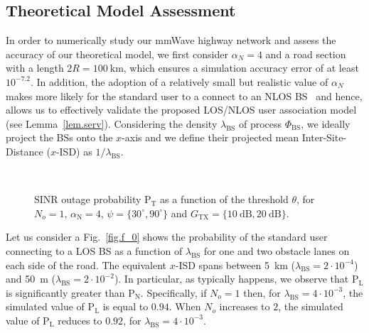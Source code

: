 \documentclass[10pt,journal,a4paper]{IEEEtran}
\begin{document}
\subsection{Theoretical Model Assessment}\label{subsec.val}
In order to numerically study our mmWave highway network and assess the accuracy of our theoretical model, we first consider $\alpha_{N} = 4$ and a road section with a length $2R = \SI{100}{\kilo\meter}$, which ensures a simulation accuracy error of at least $10^{-7.2}$. 
{In addition, the adoption of a relatively small but realistic value of $\alpha_{N}$ makes more likely for the standard user to a connect to an NLOS BS~\cite{6932503} and hence, allows us to effectively validate the proposed LOS/NLOS user association model (see Lemma~\ref{lem.serv}).}
Considering the density $\lambda_\mathrm{BS}$ of process $\Phi_\mathrm{BS}$, we ideally project the BSs onto the $x$-axis and we define their projected mean Inter-Site-Distance ($x$-ISD) as $1/\lambda_\mathrm{BS}$.

\begin{figure}[tb]
\centering
{}\\
\caption{SINR outage probability $\mathrm{P}_{\mathrm{T}}$ as a function of the threshold $\theta$, for $N_o = 1$, $\alpha_\mathrm{N} = 4$, $\psi = \{30^\circ, 90^\circ\}$ and $G_{\mathrm{TX}} = \{\SI{10}{\dB}, \SI{20}{\dB}\}$.}
\label{fig.f_1}
\end{figure}

Let us consider a Fig.~\ref{fig.f_0} shows the probability of the standard user connecting to a LOS BS as a function of $\lambda_{\mathrm{BS}}$ for one and two obstacle lanes on each side of the road.
The equivalent $x$-ISD spans between \SI{5}{\kilo\meter} ($\lambda_{\mathrm{BS}} = 2 \cdot 10^{-4}$) and \SI{50}{\meter} ($\lambda_{\mathrm{BS}} = 2 \cdot 10^{-2}$). In particular, as typically happens, we observe that $\mathrm{P}_\mathrm{L}$ is significantly greater than $\mathrm{P}_\mathrm{N}$. Specifically, if $N_o = 1$ then,  for $\lambda_{\mathrm{BS}} = 4 \cdot 10^{-3}$, the simulated value of $\mathrm{P}_\mathrm{L}$ is equal to $0.94$. When $N_o$ increases to $2$, the simulated value of $\mathrm{P}_\mathrm{L}$ reduces to $0.92$, for $\lambda_{\mathrm{BS}} = 4 \cdot 10^{-3}$.
\end{document}
